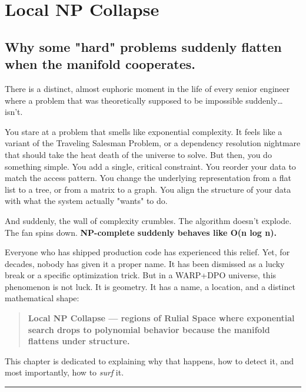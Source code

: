 \chapter{Local NP Collapse}
\label{chapter-10-local-np-collapse}

\section{\texorpdfstring{\textbf{Why some "hard" problems suddenly flatten when the manifold cooperates.}}{10.1 --- Why some "hard" problems suddenly flatten when the manifold cooperates.}}

There is a distinct, almost euphoric moment in the life of every senior engineer where a problem that was theoretically supposed to be impossible suddenly\dots{} isn't.

You stare at a problem that smells like exponential complexity. It feels like a variant of the Traveling Salesman Problem, or a dependency resolution nightmare that should take the heat death of the universe to solve. But then, you do something simple. You add a single, critical constraint. You reorder your data to match the access pattern. You change the underlying representation from a flat list to a tree, or from a matrix to a graph. You align the structure of your data with what the system actually "wants" to do.

And suddenly, the wall of complexity crumbles. The algorithm doesn't explode. The fan spins down. \textbf{NP-complete suddenly behaves like O(n log n).}

Everyone who has shipped production code has experienced this relief. Yet, for decades, nobody has given it a proper name. It has been dismissed as a lucky break or a specific optimization trick. But in a WARP+DPO universe, this phenomenon is not luck. It is geometry. It has a name, a location, and a distinct mathematical shape:

\begin{quote}
\textbf{Local NP Collapse --- regions of Rulial Space where exponential search drops to polynomial behavior because the manifold flattens under structure.}
\end{quote}

This chapter is dedicated to explaining why that happens, how to detect it, and most importantly, how to \emph{surf} it.

\begin{center}\rule{0.5\linewidth}{0.5pt}\end{center}

